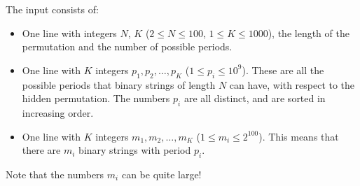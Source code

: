 
    The input consists of:
    \begin{itemize}
      \item One line with integers $N$, $K$ ($2 \leq N \leq 100$, $1 \leq K \leq 1000$), the length of the permutation and the number of possible periods.

      \item One line with $K$ integers $p_1, p_2, \dots, p_K$ ($1 \leq p_i \leq 10^9$). These are all the possible periods that binary strings of 
      length $N$ can have, with respect to the hidden permutation. The numbers $p_i$ are all distinct, and are sorted in increasing order.

      \item One line with $K$ integers $m_1, m_2, \dots, m_K$ ($1 \leq m_i \leq 2^{100}$). This means 
      that there are $m_i$ binary strings with period $p_i$.

    \end{itemize}
    
    Note that the numbers $m_i$ can be quite large!

